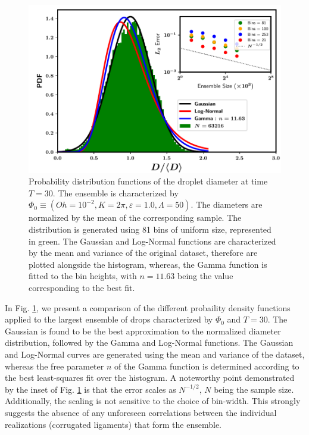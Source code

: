 \begin{figure}
\centering
\includegraphics{plots/drop_stats/long_time_diameter_fits.pdf}
\caption{Probability distribution functions of the droplet diameter at time $T = 30$. 
The ensemble is characterized by $\Phi_0 \equiv \left( Oh = 10^{-2}, K = 2\pi , \varepsilon = 1.0 , \Lambda = 50 \right)$. 
The diameters are normalized by the mean of the corresponding sample.  
The distribution is generated using 81 bins of uniform size, represented in green.  
The Gaussian and Log-Normal functions are characterized by the mean and variance of the original dataset, 
therefore are plotted alongside the histogram, whereas, the Gamma function is fitted to the bin heights,
with $n= 11.63$ being the value corresponding to the best fit.
	}
\label{t2_dia_fits}
\end{figure}


In Fig. \ref{t2_dia_fits}, we present a comparison of the different probaility 
density functions applied to the largest ensemble of drops characterized by $\Phi_0$ and $T=30$. 
The Gaussian is found to be the best approximation to the normalized 
diameter distribution, followed by the Gamma and Log-Normal functions.
The Gaussian and Log-Normal curves are generated using the mean and variance 
of the dataset, whereas the free parameter $n$ of the Gamma function is determined
according to the best least-squares fit over the histogram. 
A noteworthy point demonstrated by the inset of Fig. \ref{t2_dia_fits} is that
the error  scales as $N^{-1/2}$, $N$ being the sample size.
Additionally, the scaling is not sensitive to the choice of bin-width. 
This strongly suggests the absence of any unforeseen correlations between the 
individual realizations (corrugated ligaments) that form the ensemble.


